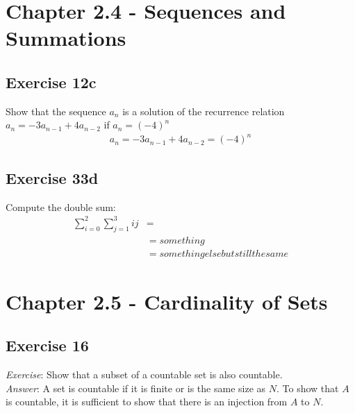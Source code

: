 \documentclass[12pt]{article}
\begin{document}
    \section{Chapter 2.4 - Sequences and Summations}
    \subsection{Exercise 12c}
    Show that the sequence {$a_n$} is a solution of the recurrence relation $a_n=-3a_{n-1}+4a_{n-2}$ if $a_n = (-4)^n$
    \begin{equation}
        \begin{split}
            a_n = -3a_{n-1}+4a_{n-2} = (-4)^n
        \end{split}
    \end{equation}

    \subsection{Exercise 33d}
    Compute the double sum:
    \begin{equation}
        \begin{split}
            \sum_{i=0}^{2}\sum_{j=1}^{3}ij &=\\
            &= something\\
            &= somethingelsebutstillthesame
        \end{split}
    \end{equation}

    \section{Chapter 2.5 - Cardinality of Sets}
    \subsection{Exercise 16}
    \emph{Exercise}: 
    Show that a subset of a countable set is also countable.\\
    \emph{Answer}:
    A set is countable if it is finite or is the same size as $N$.
    To show that $A$ is countable, it is sufficient to show that there is an injection
    from $A$ to $N$.

    
\end{document}
